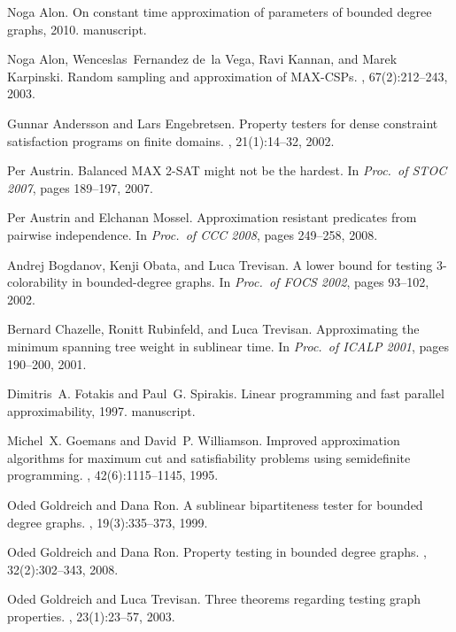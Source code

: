 \documentclass[letterpaper, 11pt]{article}
\begin{document}
\begin{thebibliography}{10}

Noga Alon.
\newblock On constant time approximation of parameters of bounded degree
  graphs, 2010.
\newblock manuscript.

Noga Alon, Wenceslas~Fernandez de~la Vega, Ravi Kannan, and Marek Karpinski.
\newblock Random sampling and approximation of {MAX}-{CSPs}.
, 67(2):212--243, 2003.

Gunnar Andersson and Lars Engebretsen.
\newblock Property testers for dense constraint satisfaction programs on finite
  domains.
, 21(1):14--32, 2002.

Per Austrin.
\newblock Balanced {MAX} 2-{SAT} might not be the hardest.
\newblock In {\em Proc.~of STOC 2007}, pages 189--197, 2007.

Per Austrin and Elchanan Mossel.
\newblock Approximation resistant predicates from pairwise independence.
\newblock In {\em Proc.~of CCC 2008}, pages 249--258, 2008.

Andrej Bogdanov, Kenji Obata, and Luca Trevisan.
\newblock A lower bound for testing 3-colorability in bounded-degree graphs.
\newblock In {\em Proc.~of FOCS 2002}, pages 93--102, 2002.

Bernard Chazelle, Ronitt Rubinfeld, and Luca Trevisan.
\newblock Approximating the minimum spanning tree weight in sublinear time.
\newblock In {\em Proc.~of ICALP 2001}, pages 190--200, 2001.

Dimitris~A. Fotakis and Paul~G. Spirakis.
\newblock Linear programming and fast parallel approximability, 1997.
\newblock manuscript.

Michel~X. Goemans and David~P. Williamson.
\newblock Improved approximation algorithms for maximum cut and satisfiability
  problems using semidefinite programming.
, 42(6):1115--1145, 1995.

Oded Goldreich and Dana Ron.
\newblock A sublinear bipartiteness tester for bounded degree graphs.
, 19(3):335--373, 1999.

Oded Goldreich and Dana Ron.
\newblock Property testing in bounded degree graphs.
, 32(2):302--343, 2008.

Oded Goldreich and Luca Trevisan.
\newblock Three theorems regarding testing graph properties.
, 23(1):23--57, 2003.


\end{thebibliography}
\end{document}
